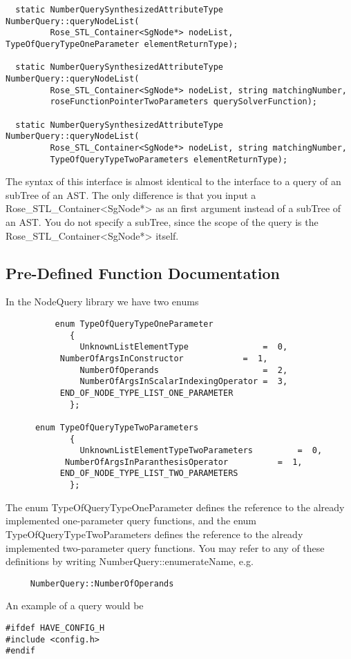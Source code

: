{\begin{verbatim}
  static NumberQuerySynthesizedAttributeType NumberQuery::queryNodeList(
         Rose_STL_Container<SgNode*> nodeList, TypeOfQueryTypeOneParameter elementReturnType);
	  
  static NumberQuerySynthesizedAttributeType NumberQuery::queryNodeList(
         Rose_STL_Container<SgNode*> nodeList, string matchingNumber, 
         roseFunctionPointerTwoParameters querySolverFunction);  

  static NumberQuerySynthesizedAttributeType NumberQuery::queryNodeList(
         Rose_STL_Container<SgNode*> nodeList, string matchingNumber, 
         TypeOfQueryTypeTwoParameters elementReturnType);
\end{verbatim}
The syntax of this interface is almost identical to the interface to a query
of an subTree of an AST.  The only difference is that you input a
Rose\_STL\_Container<SgNode*> as an first argument instead of a subTree of an AST. You
do not specify a subTree, since the scope of the query is the Rose\_STL\_Container<SgNode*> itself.  


\subsection{Pre-Defined Function Documentation}
\label{FunctionDocumentation}

In the NodeQuery library we have two enums
\begin{verbatim}
          enum TypeOfQueryTypeOneParameter
             {
               UnknownListElementType               =  0,
	       NumberOfArgsInConstructor            =  1,
               NumberOfOperands                     =  2,
               NumberOfArgsInScalarIndexingOperator =  3,
	       END_OF_NODE_TYPE_LIST_ONE_PARAMETER
             };
	 
	  enum TypeOfQueryTypeTwoParameters
             {
               UnknownListElementTypeTwoParameters         =  0,
	        NumberOfArgsInParanthesisOperator          =  1,
	       END_OF_NODE_TYPE_LIST_TWO_PARAMETERS
             };
\end{verbatim}
The enum TypeOfQueryTypeOneParameter defines the reference to the
already implemented one-parameter query functions, and the enum 
TypeOfQueryTypeTwoParameters defines the reference to the already
implemented two-parameter query functions. You may refer to any of
these definitions by writing NumberQuery::enumerateName, e.g.
\begin{verbatim}
     NumberQuery::NumberOfOperands
\end{verbatim}
An example of a query would be 
\begin{verbatim}
#ifdef HAVE_CONFIG_H
#include <config.h>
#endif


\end{verbatim}}
